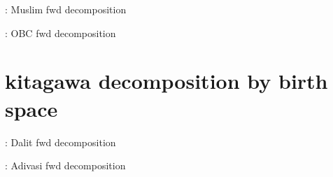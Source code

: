 \documentclass{article}
\begin{document}
\begin{table}[H]
    \centering
    \footnotesize %
    \caption{: Muslim fwd decomposition}
    \label{tab:sumstat}
\end{table}

\begin{table}[H]
    \centering
    \footnotesize %
    \caption{: OBC fwd decomposition}
    \label{tab:sumstat}
\end{table}

\section{kitagawa decomposition by birth space}




\begin{table}[H]
    \centering
    \footnotesize %
    \caption{: Dalit fwd decomposition}
    \label{tab:sumstat}
\end{table}

\begin{table}[H]
    \centering
    \footnotesize %
    \caption{: Adivasi fwd decomposition}
    \label{tab:sumstat}
\end{table}
\end{document}
